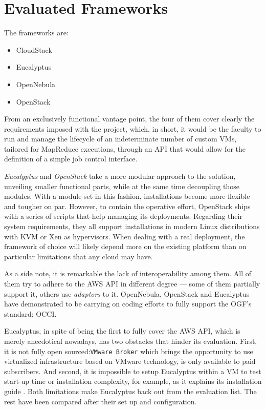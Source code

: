 \section{Evaluated Frameworks}\label{sec:frameworksevaluados}

\noindent The frameworks are:
\begin{itemize}
 \item CloudStack %
 \item Eucalyptus %
 \item OpenNebula %
 \item OpenStack
\end{itemize}

From an exclusively functional vantage point, the four of them cover clearly the requirements imposed with the project, which, in short, it would be the faculty to run and manage the lifecycle of an indeterminate number of custom VMs, tailored for MapReduce executions, through an API that would allow for the definition of a simple job control interface.

\emph{Eucalyptus} and \emph{OpenStack} take a more modular approach to the solution, unveiling smaller functional parts, while at the same time decoupling those modules. With a module set in this fashion, installations become more flexible and tougher on par. However, to contain the operative effort, OpenStack ships with a series of scripts that help managing its deployments. Regarding their system requirements, they all support installations in modern Linux distributions with KVM or Xen as hypervisors. When dealing with a real deployment, the framework of choice will likely depend more on the existing platform than on particular limitations that any cloud may have.

As a side note, it is remarkable the lack of interoperability among them. All of them try to adhere to the AWS API in different degree --- some of them partially support it, others use \emph{adaptors} to it. OpenNebula, OpenStack and Eucalyptus have demonstrated to be carrying on coding efforts to fully support the OGF's standard: OCCI.


Eucalyptus, in spite of being the first to fully cover the AWS API, which is merely anecdotical nowadays, has two obstacles that hinder its evaluation. First, it is not fully open sourced:\texttt{VMware Broker} which brings the opportunity to use virtualized infrastructure based on  VMware technology, is only available to paid subscribers. And second, it is impossible to setup Eucalyptus within a VM to test start-up time or installation complexity, for example, as it explains its installation guide \cite{eucainstall}. Both limitations make Eucalyptus back out from the evaluation list. The rest have been compared after their set up and configuration.

